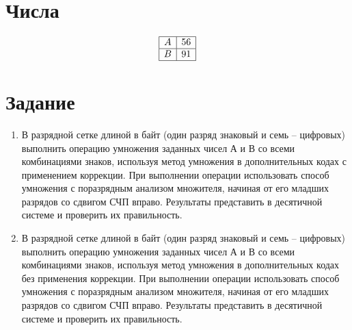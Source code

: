 \documentclass{article}
\begin{document}
\itmo[
       variant=110,
       labn=4,
       worktype=Домашняя работа,
       discipline=Дискретная математика,
       group=P3115,
       student=Владимир Мацюк,
       teacher=Поляков Владимир Иванович,
       logo=../../../lib/img/itmo.png
]

\newcommand{\car}{\multicolumn{1}{c@{\hspace*{\tabcolsep}\makebox[0pt]{\curvearrowleft}}}{}}
\newcommand{\rcar}{\multicolumn{1}{c@{\hspace*{\tabcolsep}\makebox[0pt]{\curvearrowright}}}{}}
\newcommand{\ncar}{\multicolumn{1}{c@{\hspace*{\tabcolsep}\makebox[0pt]{}}}{}}
\newcommand{\SPACE}{\multicolumn{12}{c}{}}
\newcommand{\INT}{\multicolumn{5}{c}{\MM{Интерпретации}}}
\newcommand{\PLUS}{\multirow{2}{*}{+}}
\newcommand{\MINUS}{\multirow{2}{*}{-}}
\newcommand{\SIGN}{\multicolumn{2}{c}{\MM{Знаковая}}}
\newcommand{\USIGN}{\multicolumn{2}{c}{\MM{Беззнаковая}}}

\section{Числа}
$$
       \begin{array}{|c|c|}
              \hline
              A & 56 \\\hline
              B & 91 \\\hline
       \end{array}
$$
\section{Задание}

\begin{center}

       \begin{enumerate}
              \item В разрядной сетке длиной в байт (один разряд знаковый и семь – цифровых) выполнить операцию умножения заданных чисел А и В со всеми комбинациями знаков, используя метод умножения в дополнительных кодах с применением коррекции. При выполнении операции использовать способ умножения с поразрядным анализом множителя, начиная от его младших разрядов со сдвигом СЧП вправо. Результаты представить в десятичной системе и проверить их правильность.
                    
                    
                    
              \item В разрядной сетке длиной в байт (один разряд знаковый и семь – цифровых) выполнить операцию умножения заданных чисел А и В со всеми комбинациями знаков, используя метод умножения в дополнительных кодах без применения коррекции. При выполнении операции использовать способ умножения с поразрядным анализом множителя, начиная от его младших разрядов со сдвигом СЧП вправо. Результаты представить в десятичной системе и проверить их правильность.
                    
                     
       \end{enumerate}
\end{center}
\end{document}
